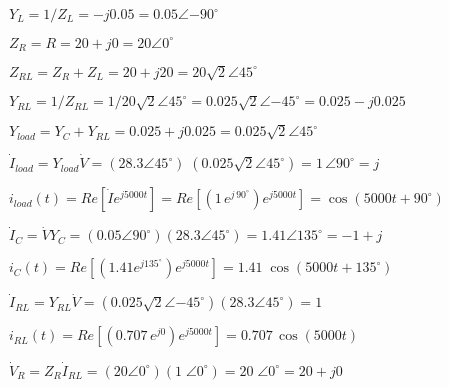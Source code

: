\documentclass{article}
\def\lthtmlcheckvsize{\ifdim\ht\sizebox<\vsize 
  \ifdim\wd\sizebox<\hsize\expandafter\hfill\fi \expandafter\vfill
  \else\expandafter\vss\fi}%
\begin{document}
{\newpage\clearpage
{}%
$ Y_L=1/Z_L=-j0.05=0.05\angle{-90^\circ}$%
\lthtmlindisplaymathZ
\lthtmlcheckvsize\clearpage}

{\newpage\clearpage
{}%
$ Z_R=R=20+j0=20\angle{0^\circ}$%
\lthtmlindisplaymathZ
\lthtmlcheckvsize\clearpage}

{\newpage\clearpage
{}%
$ Z_{RL}=Z_R+Z_L=20+j20=20\sqrt{2}\angle{45^\circ}$%
\lthtmlindisplaymathZ
\lthtmlcheckvsize\clearpage}

{\newpage\clearpage
{}%
$ Y_{RL}=1/Z_{RL}=1/20\sqrt{2}\angle{45^\circ}
	=0.025\sqrt{2}\angle{-45^\circ}=0.025-j0.025$%
\lthtmlindisplaymathZ
\lthtmlcheckvsize\clearpage}

{\newpage\clearpage
{}%
$ Y_{load}=Y_C+Y_{RL}=0.025+j0.025=0.025\sqrt{2}\angle{45^\circ}$%
\lthtmlindisplaymathZ
\lthtmlcheckvsize\clearpage}

{\newpage\clearpage
{}%
$ \dot{I}_{load}=Y_{load}\dot{V}=(28.3\angle{45^\circ})\;
  (0.025\sqrt{2}\angle{45^\circ})=1\,\angle{90^\circ}=j$%
\lthtmlindisplaymathZ
\lthtmlcheckvsize\clearpage}

{\newpage\clearpage
{}%
$ i_{load}(t)=Re[\dot{I} e^{j5000t}]=Re[(1\,e^{j\,90^\circ}) e^{j5000t}]
  =\cos(5000t+90^\circ)$%
\lthtmlindisplaymathZ
\lthtmlcheckvsize\clearpage}

{\newpage\clearpage
{}%
$ \dot{I}_C=\dot{V}Y_C=(0.05\angle{90^\circ})(28.3\angle{45^\circ})
  =1.41\angle{135^\circ}=-1+j$%
\lthtmlindisplaymathZ
\lthtmlcheckvsize\clearpage}

{\newpage\clearpage
{}%
$ i_C(t)=Re[ (1.41 e^{j 135^\circ}) e^{j5000t}]=1.41\;\cos(5000t+135^\circ)$%
\lthtmlindisplaymathZ
\lthtmlcheckvsize\clearpage}

{\newpage\clearpage
{}%
$ \dot{I}_{RL}=Y_{RL}\dot{V}=(0.025\sqrt{2}\angle{-45^\circ})(28.3\angle{45^\circ})
  =1$%
\lthtmlindisplaymathZ
\lthtmlcheckvsize\clearpage}

{\newpage\clearpage
{}%
$ i_{RL}(t)=Re[ (0.707\,e^{j0}) e^{j5000t} ]=0.707\,\cos(5000t)$%
\lthtmlindisplaymathZ
\lthtmlcheckvsize\clearpage}

{\newpage\clearpage
{}%
$ \dot{V}_R=Z_R\dot{I}_{RL}=(20\angle{0^\circ})(1\;\angle{0^\circ})
  =20\;\angle{0^\circ}=20+j0$%
\lthtmlindisplaymathZ
\lthtmlcheckvsize\clearpage}
\end{document}
